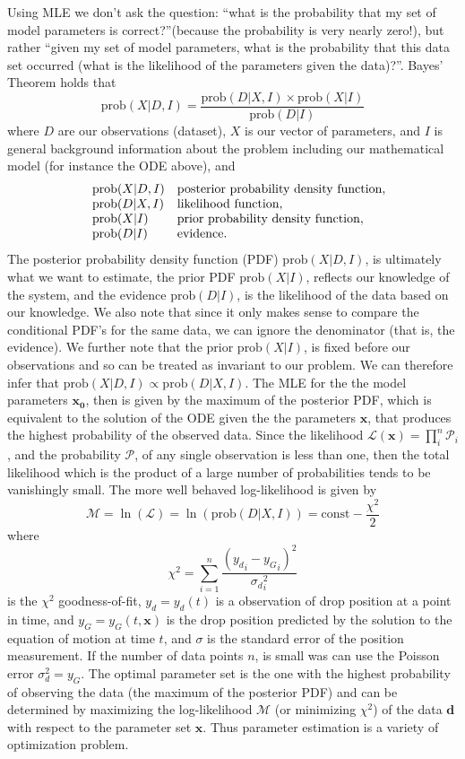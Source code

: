 \documentclass[12pt,a4paper,oneside]{book}
\begin{document}
Using MLE we don't ask the question: ``what is the probability that my set of model parameters is correct?''(because the probability is very nearly zero!), but rather ``given my set of model parameters, what is the probability that this data set occurred (what is the likelihood of the parameters given the data)?''. Bayes' Theorem holds that
\[\mbox{prob}(X|D, I) = \frac{\mbox{prob}(D|X,I) \times \mbox{prob}(X|I)}{\mbox{prob}(D|I)}\]
where $D$ are our observations (dataset), $X$ is our vector of parameters, and $I$ is general background information about the problem including our mathematical model (for instance the ODE above), and 
\[\begin{array}{lll}
& \centering \mbox{prob}(X|D, I) & \mbox{posterior probability density function},\\
& \centering \mbox{prob}(D|X, I) & \mbox{likelihood function},\\
& \centering \mbox{prob}(X|I) &  \mbox{prior probability density function},\\
& \centering \mbox{prob}(D|I) &  \mbox{evidence}.
\end{array}
\]
The posterior probability density function (PDF) $\mbox{prob}(X|D, I)$, is ultimately what we want to estimate, the prior PDF $\mbox{prob}(X|I)$, reflects our knowledge of the system, and the evidence $\mbox{prob}(D|I)$, is the likelihood of the data based on our knowledge. We also note that since it only makes sense to compare the conditional PDF's for the same data, we can ignore the denominator (that is, the evidence). We further note that the prior $\mbox{prob}(X|I)$, is fixed before our observations and so can be
treated as invariant to our problem. We can therefore infer that $\mbox{prob}(X|D, I) \propto \mbox{prob}(D|X, I)$. The MLE for the the model parameters $\mathbf{x_0}$, then is given by the maximum of the posterior PDF, which is equivalent to the solution of the ODE given the the parameters $\mathbf{x}$, that produces the highest probability of the observed data. Since the likelihood $\mathcal{L}(\mathbf{x}) = \prod_i^n \mathcal{P}_i$, and the probability $\mathcal{P}$, of any single observation is less than one, then the total likelihood which is the product of a large number of probabilities tends to be vanishingly small. The more well behaved log-likelihood is given by
\[\mathcal{M} = \ln(\mathcal{L}) = \ln(\mbox{prob}(D|X, I)) = \mbox{const} - \frac{\chi^2}{2}\]
where 
\[
\chi^2 = \sum^n_{i=1} \frac{\left({y_d}_i - {y_G}_i \right)^2}{{\sigma_d}_i^2}
\]
is the $\chi^2$ goodness-of-fit, $y_d = y_d(t)$ is a observation of drop position at a point in time, and $y_G =  y_G(t, \mathbf{x})$ is the drop position predicted by the solution to the equation of motion at time $t$, and $\sigma$ is the standard error of the position measurement. If the number of data points $n$, is small was can use the Poisson error $\sigma_d^2 = {y_G}$. The optimal parameter set is the one with the highest probability of observing the data (the maximum of the posterior PDF) and can be determined by maximizing the log-likelihood $\mathcal{M}$ (or minimizing $\chi^2$) of the data $\mathbf{d}$ with respect to the parameter set $\mathbf{x}$. Thus parameter estimation is a variety of optimization problem.
\end{document}

